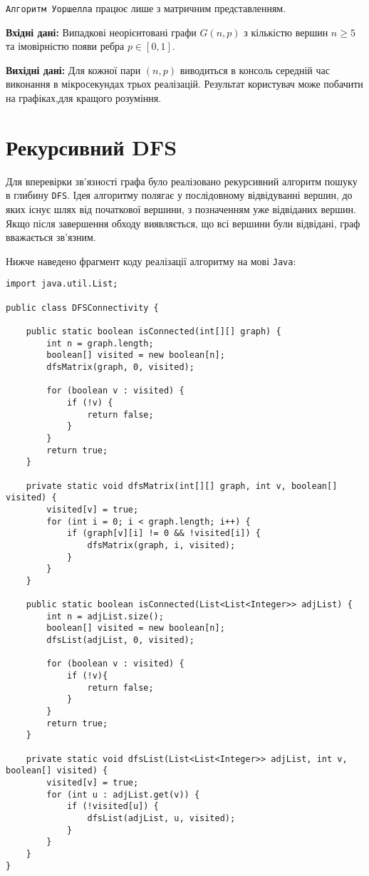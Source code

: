 \documentclass[12pt,a4paper]{article}
\begin{document}
 \texttt{Алгоритм Уоршелла} працює лише з матричним представленням.


\textbf{Вхідні дані:}
Випадкові неорієнтовані графи  $G(n,p)$ з кількістю вершин $n \geq 5$
та імовірністю появи ребра $p \in [0,1]$.

\textbf{Вихідні дані:}
Для кожної пари $(n,p)$ виводиться в консоль середній час виконання в мікросекундах трьох реалізацій.
Результат користувач може побачити на графіках,для кращого розуміння.

\section{Рекурсивний DFS}
Для вперевірки зв’язності графа було реалізовано рекурсивний алгоритм пошуку в глибину \texttt{DFS}.
Ідея алгоритму полягає у послідовному відвідуванні вершин, 
до яких існує шлях від початкової вершини, 
з позначенням уже відвіданих вершин. 
Якщо після завершення обходу виявляється, що всі вершини були відвідані, 
граф вважається зв’язним.

Нижче наведено фрагмент коду реалізації алгоритму на мові \texttt{Java}:

\begin{lstlisting}[style=javastyle]
import java.util.List;

public class DFSConnectivity {

    public static boolean isConnected(int[][] graph) {
        int n = graph.length;
        boolean[] visited = new boolean[n];
        dfsMatrix(graph, 0, visited);

        for (boolean v : visited) {
            if (!v) {
                return false;
            }
        }
        return true;
    }

    private static void dfsMatrix(int[][] graph, int v, boolean[] visited) {
        visited[v] = true;
        for (int i = 0; i < graph.length; i++) {
            if (graph[v][i] != 0 && !visited[i]) {
                dfsMatrix(graph, i, visited);
            }
        }
    }

    public static boolean isConnected(List<List<Integer>> adjList) {
        int n = adjList.size();
        boolean[] visited = new boolean[n];
        dfsList(adjList, 0, visited);

        for (boolean v : visited) {
            if (!v){
                return false;
            }
        }
        return true;
    }

    private static void dfsList(List<List<Integer>> adjList, int v, boolean[] visited) {
        visited[v] = true;
        for (int u : adjList.get(v)) {
            if (!visited[u]) {
                dfsList(adjList, u, visited);
            }
        }
    }
}
\end{lstlisting}
\end{document}
